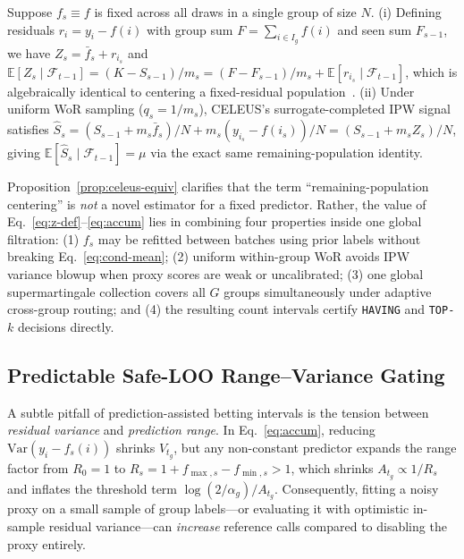 \begin{proposition}
\label{prop:celeus-equiv}
Suppose $f_s \equiv f$ is fixed across all draws in a single group of size $N$.
(i) Defining residuals $r_i = y_i - f(i)$ with group sum $F = \sum_{i \in I_g} f(i)$ and seen sum $F_{s-1}$, we have $Z_s = \bar{f}_s + r_{i_s}$ and $\mathbb{E}[Z_s \mid \mathcal{F}_{t-1}] = (K - S_{s-1})/m_s = (F - F_{s-1})/m_s + \mathbb{E}[r_{i_s} \mid \mathcal{F}_{t-1}]$, which is algebraically identical to centering a fixed-residual population~\cite{angelopoulos2023ppi}.
(ii) Under uniform WoR sampling ($q_s = 1/m_s$), CELEUS's surrogate-completed IPW signal~\cite{zhou2026celeus} satisfies $\hat{S}_s = (S_{s-1} + m_s \bar{f}_s)/N + m_s (y_{i_s} - f(i_s))/N = (S_{s-1} + m_s Z_s)/N$, giving $\mathbb{E}[\hat{S}_s \mid \mathcal{F}_{t-1}] = \mu$ via the exact same remaining-population identity.
\end{proposition}

Proposition~\ref{prop:celeus-equiv} clarifies that the term ``remaining-population centering'' is \emph{not} a novel estimator for a fixed predictor.
Rather, the value of Eq.~\eqref{eq:z-def}--\eqref{eq:accum} lies in combining four properties inside one global filtration: (1) $f_s$ may be refitted between batches using prior labels without breaking Eq.~\eqref{eq:cond-mean}; (2) uniform within-group WoR avoids IPW variance blowup when proxy scores are weak or uncalibrated; (3) one global supermartingale collection covers all $G$ groups simultaneously under adaptive cross-group routing; and (4) the resulting count intervals certify \texttt{HAVING} and \texttt{TOP-$k$} decisions directly.

\subsection{Predictable Safe-LOO Range--Variance Gating}
\label{sec:safe-loo}

A subtle pitfall of prediction-assisted betting intervals is the tension between \emph{residual variance} and \emph{prediction range}.
In Eq.~\eqref{eq:accum}, reducing $\mathrm{Var}(y_i - f_s(i))$ shrinks $V_{t_g}$, but any non-constant predictor expands the range factor from $R_0 = 1$ to $R_s = 1 + f_{\max,s} - f_{\min,s} > 1$, which shrinks $A_{t_g} \propto 1/R_s$ and inflates the threshold term $\log(2/\alpha_g)/A_{t_g}$.
Consequently, fitting a noisy proxy on a small sample of group labels---or evaluating it with optimistic in-sample residual variance---can \emph{increase} reference calls compared to disabling the proxy entirely.

